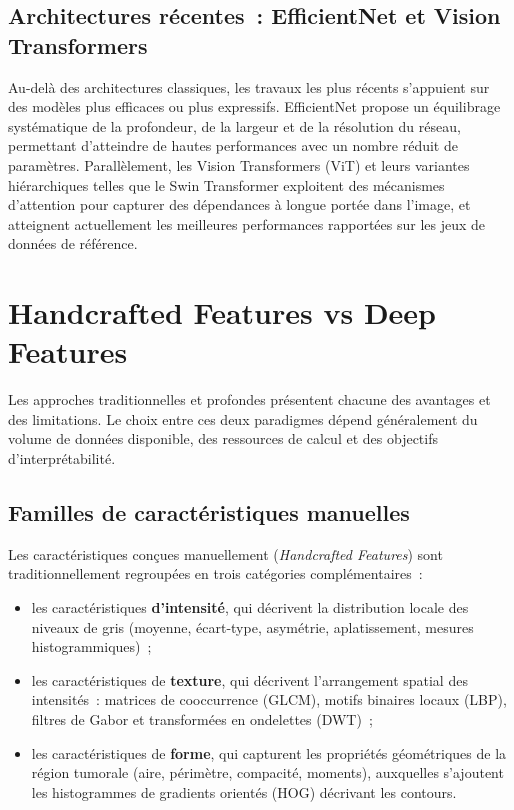 \subsection{Architectures récentes~: EfficientNet et Vision Transformers}

Au-delà des architectures classiques, les travaux les plus récents s'appuient sur des modèles
plus efficaces ou plus expressifs. EfficientNet propose un équilibrage systématique de la
profondeur, de la largeur et de la résolution du réseau, permettant d'atteindre de hautes
performances avec un nombre réduit de paramètres. Parallèlement, les Vision Transformers (ViT)
et leurs variantes hiérarchiques telles que le Swin Transformer exploitent des mécanismes
d'attention pour capturer des dépendances à longue portée dans l'image, et atteignent
actuellement les meilleures performances rapportées sur les jeux de données de référence.

\section{Handcrafted Features vs Deep Features}

Les approches traditionnelles et profondes présentent chacune des avantages et des
limitations. Le choix entre ces deux paradigmes dépend généralement du volume de données
disponible, des ressources de calcul et des objectifs d'interprétabilité.

\subsection{Familles de caractéristiques manuelles}

Les caractéristiques conçues manuellement (\emph{Handcrafted Features}) sont traditionnellement
regroupées en trois catégories complémentaires~:

\begin{itemize}[leftmargin=1.4em,itemsep=2pt]
  \item les caractéristiques \textbf{d'intensité}, qui décrivent la distribution locale des
        niveaux de gris (moyenne, écart-type, asymétrie, aplatissement, mesures
        histogrammiques)~;
  \item les caractéristiques de \textbf{texture}, qui décrivent l'arrangement spatial des
        intensités~: matrices de cooccurrence (GLCM), motifs binaires locaux (LBP), filtres
        de Gabor et transformées en ondelettes (DWT)~;
  \item les caractéristiques de \textbf{forme}, qui capturent les propriétés géométriques de
        la région tumorale (aire, périmètre, compacité, moments), auxquelles s'ajoutent les
        histogrammes de gradients orientés (HOG) décrivant les contours.
\end{itemize}

